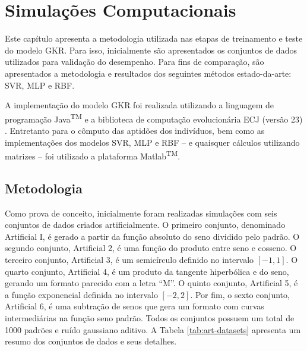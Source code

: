 \chapter{Simulações Computacionais}\label{chapter:simulations}

Este capítulo apresenta a metodologia utilizada nas etapas de treinamento e teste do modelo GKR. Para isso, inicialmente são apresentados os conjuntos de dados utilizados para validação do desempenho. Para fins de comparação, são apresentados a metodologia e resultados dos seguintes métodos estado-da-arte: SVR, MLP e RBF.

A implementação do modelo GKR foi realizada utilizando a linguagem de programação Java\textsuperscript{TM} e a biblioteca de computação evolucionária ECJ (versão 23) \cite{luke2015}. Entretanto para o cômputo das aptidões dos indivíduos, bem como as implementações dos modelos SVR, MLP e RBF -- e quaisquer cálculos utilizando matrizes -- foi utilizado a plataforma Matlab\textsuperscript{TM}.

\section{Metodologia}
Como prova de conceito, inicialmente foram realizadas simulações com seis conjuntos de dados criados artificialmente. O primeiro conjunto, denominado Artificial I, é gerado a partir da função absoluto do seno dividido pelo padrão. O segundo conjunto, Artificial 2, é uma função do produto entre seno e cosseno. O terceiro conjunto, Artificial 3, é um semicírculo definido no intervalo $[-1,1]$. O quarto conjunto, Artificial 4, é um produto da tangente hiperbólica e do seno, gerando um formato parecido com a letra ``M''. O quinto conjunto, Artificial 5, é a função exponencial definida no intervalo $[-2,2]$. Por fim, o sexto conjunto, Artificial 6, é uma subtração de senos que gera um formato com curvas intermediárias na função seno padrão. Todos os conjuntos possuem um total de 1000 padrões e ruído gaussiano aditivo. A Tabela \ref{tab:art-datasets} apresenta um resumo dos conjuntos de dados e seus detalhes.

